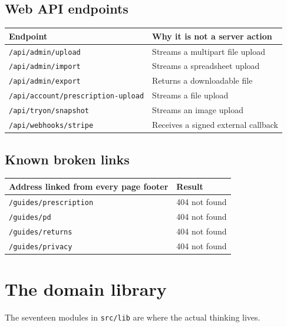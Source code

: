 \documentclass[11pt,a4paper]{report}
\newcommand{\code}[1]{\texttt{\small #1}}
\begin{document}
\section{Web API endpoints}

\begin{center}
\begin{tabular}{@{}ll@{}}
\toprule
\textbf{Endpoint} & \textbf{Why it is not a server action}\\
\midrule
\code{/api/admin/upload} & Streams a multipart file upload\\
\code{/api/admin/import} & Streams a spreadsheet upload\\
\code{/api/admin/export} & Returns a downloadable file\\
\code{/api/account/prescription-upload} & Streams a file upload\\
\code{/api/tryon/snapshot} & Streams an image upload\\
\code{/api/webhooks/stripe} & Receives a signed external callback\\
\bottomrule
\end{tabular}
\end{center}

\section{Known broken links}

\begin{center}
\begin{tabular}{@{}ll@{}}
\toprule
\textbf{Address linked from every page footer} & \textbf{Result}\\
\midrule
\code{/guides/prescription} & 404 not found\\
\code{/guides/pd} & 404 not found\\
\code{/guides/returns} & 404 not found\\
\code{/guides/privacy} & 404 not found\\
\bottomrule
\end{tabular}
\end{center}

\chapter{The domain library}

The seventeen modules in \code{src/lib} are where the actual thinking lives.
\end{document}
